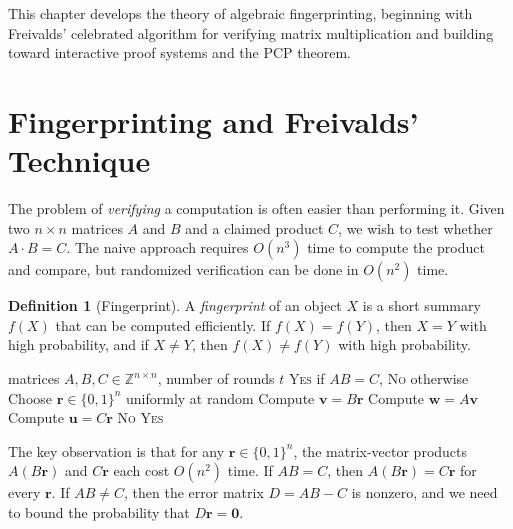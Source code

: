 \documentclass[twoside,12pt]{book}
\theoremstyle{plain}
\theoremstyle{definition}
\newtheorem{definition}[theorem]{Definition}
\theoremstyle{remark}
\begin{document}
This chapter develops the theory of algebraic fingerprinting, beginning with Freivalds' celebrated algorithm for verifying matrix multiplication and building toward interactive proof systems and the PCP theorem.

\section{Fingerprinting and Freivalds' Technique}
\label{sec:freivalds}

The problem of \emph{verifying} a computation is often easier than performing it. Given two $n \times n$ matrices $A$ and $B$ and a claimed product $C$, we wish to test whether $A \cdot B = C$. The naive approach requires $O(n^3)$ time to compute the product and compare, but randomized verification can be done in $O(n^2)$ time.

\begin{definition}[Fingerprint]
A \emph{fingerprint} of an object $X$ is a short summary $f(X)$ that can be computed efficiently. If $f(X) = f(Y)$, then $X = Y$ with high probability, and if $X \neq Y$, then $f(X) \neq f(Y)$ with high probability.
\end{definition}

\begin{algorithm}[H]
\caption{Freivalds' Algorithm}
\label{alg:freivalds}
\begin{algorithmic}[1]
\Require matrices $A, B, C \in \mathbb{Z}^{n \times n}$, number of rounds $t$
\Ensure \textsc{Yes} if $AB = C$, \textsc{No} otherwise
  \State Choose $\mathbf{r} \in \{0, 1\}^n$ uniformly at random
  \State Compute $\mathbf{v} = B\mathbf{r}$ 
  \State Compute $\mathbf{w} = A\mathbf{v}$ 
  \State Compute $\mathbf{u} = C\mathbf{r}$ 
    \State \Return \textsc{No}
  \EndIf
\EndFor
\State \Return \textsc{Yes}
\end{algorithmic}
\end{algorithm}

The key observation is that for any $\mathbf{r} \in \{0,1\}^n$, the matrix-vector products $A(B\mathbf{r})$ and $C\mathbf{r}$ each cost $O(n^2)$ time. If $AB = C$, then $A(B\mathbf{r}) = C\mathbf{r}$ for every $\mathbf{r}$. If $AB \neq C$, then the error matrix $D = AB - C$ is nonzero, and we need to bound the probability that $D\mathbf{r} = \mathbf{0}$.
\end{document}
